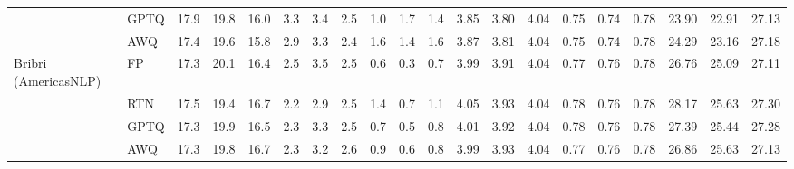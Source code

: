 \begin{landscape}
\begin{longtable}{llrrrrrrrrrrrrrrrrrr}
 & GPTQ & \cellcolor{loss!1}17.9 & \cellcolor{loss!4}19.8 & \cellcolor{loss!2}16.0 & \cellcolor{loss!3}3.3 & \cellcolor{loss!1}3.4 & \cellcolor{loss!1}2.5 & 1.0 & 1.7 & 1.4 & \cellcolor{loss!2}3.85 & \cellcolor{loss!3}3.80 & \cellcolor{loss!1}4.04 & \cellcolor{loss!3}0.75 & \cellcolor{loss!3}0.74 & \cellcolor{loss!2}0.78 & \cellcolor{loss!4}23.90 & \cellcolor{loss!5}22.91 & \cellcolor{loss!3}27.13 \\
 & AWQ & \cellcolor{loss!8}17.4 & \cellcolor{loss!6}19.6 & \cellcolor{loss!5}15.8 & \cellcolor{loss!5}2.9 & \cellcolor{loss!2}3.3 & \cellcolor{loss!2}2.4 & \cellcolor{loss!8}1.6 & 1.4 & 1.6 & \cellcolor{loss!4}3.87 & \cellcolor{loss!4}3.81 & \cellcolor{loss!2}4.04 & \cellcolor{loss!4}0.75 & \cellcolor{loss!4}0.74 & 0.78 & \cellcolor{loss!7}24.29 & \cellcolor{loss!7}23.16 & \cellcolor{loss!3}27.18 \\
\midrule
Bribri (AmericasNLP) & FP & 17.3 & 20.1 & 16.4 & 2.5 & 3.5 & 2.5 & 0.6 & 0.3 & 0.7 & 3.99 & 3.91 & 4.04 & 0.77 & 0.76 & 0.78 & 26.76 & 25.09 & 27.11 \\
 & RTN & 17.5 & \cellcolor{loss!10}19.4 & 16.7 & \cellcolor{loss!2}2.2 & \cellcolor{loss!4}2.9 & 2.5 & \cellcolor{loss!15}1.4 & \cellcolor{loss!8}0.7 & \cellcolor{loss!8}1.1 & \cellcolor{loss!4}4.05 & \cellcolor{loss!1}3.93 & 4.04 & \cellcolor{loss!4}0.78 & 0.76 & 0.78 & \cellcolor{loss!9}28.17 & \cellcolor{loss!4}25.63 & \cellcolor{loss!1}27.30 \\
 & GPTQ & \cellcolor{loss!0}17.3 & \cellcolor{loss!3}19.9 & 16.5 & \cellcolor{loss!2}2.3 & \cellcolor{loss!1}3.3 & 2.5 & \cellcolor{loss!2}0.7 & \cellcolor{loss!3}0.5 & \cellcolor{loss!2}0.8 & \cellcolor{loss!2}4.01 & \cellcolor{loss!1}3.92 & \cellcolor{loss!0}4.04 & \cellcolor{loss!3}0.78 & 0.76 & \cellcolor{loss!1}0.78 & \cellcolor{loss!4}27.39 & \cellcolor{loss!2}25.44 & \cellcolor{loss!1}27.28 \\
 & AWQ & \cellcolor{loss!0}17.3 & \cellcolor{loss!4}19.8 & 16.7 & \cellcolor{loss!1}2.3 & \cellcolor{loss!2}3.2 & 2.6 & \cellcolor{loss!6}0.9 & \cellcolor{loss!7}0.6 & \cellcolor{loss!2}0.8 & \cellcolor{loss!0}3.99 & \cellcolor{loss!2}3.93 & 4.04 & \cellcolor{loss!1}0.77 & 0.76 & \cellcolor{loss!1}0.78 & \cellcolor{loss!1}26.86 & \cellcolor{loss!4}25.63 & \cellcolor{loss!0}27.13 \\
\midrule
\end{longtable}
\end{landscape}

